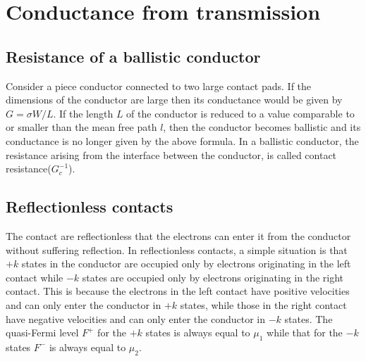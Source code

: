 \documentclass[11pt,a4paper]{book}
\theoremstyle{plain}
\theoremstyle{definition}
\theoremstyle{remark}
\begin{document}
\chapter{Conductance from transmission}
\section{Resistance of a ballistic conductor}
Consider a piece conductor connected to two large contact pads. If the dimensions of the conductor are large then its conductance would be given by $G=\sigma W/L$. If the length $L$ of the conductor is reduced to a value comparable to or smaller than the mean free path $l$, then the conductor becomes ballistic and its conductance is no longer given by the above formula. In a ballistic conductor, the resistance arising from the interface between the conductor, is called contact resistance($G_c^{-1}$).

\section{Reflectionless contacts}
The contact are reflectionless that the electrons can enter it from the conductor without suffering reflection. In reflectionless contacts, a simple situation is that $+k$ states in the conductor are occupied only by electrons originating in the left contact while $-k$ states are occupied only by electrons originating in the right contact. This is because the electrons in the left contact have positive velocities and can only enter the conductor in $+k$ states, while those in the right contact have negative velocities and can only enter the conductor in $-k$ states. The quasi-Fermi level $F^+$ for the $+k$ states is always equal to $\mu_1$ while that for the $-k$ states $F^-$ is always equal to $\mu_2$.
\end{document}
